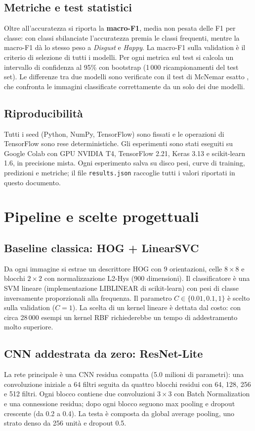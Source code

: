 \documentclass[11pt,a4paper]{article}
\begin{document}
\subsection{Metriche e test statistici}
Oltre all'accuratezza si riporta la \textbf{macro-F1}, media non pesata delle F1 per classe: con classi sbilanciate l'accuratezza premia le classi frequenti, mentre la macro-F1 dà lo stesso peso a \textit{Disgust} e \textit{Happy}. La macro-F1 sulla validation è il criterio di selezione di tutti i modelli. Per ogni metrica sul test si calcola un intervallo di confidenza al 95\% con bootstrap (1\,000 ricampionamenti del test set). Le differenze tra due modelli sono verificate con il test di McNemar esatto \cite{dietterich1998tests}, che confronta le immagini classificate correttamente da un solo dei due modelli.

\subsection{Riproducibilità}
Tutti i seed (Python, NumPy, TensorFlow) sono fissati e le operazioni di TensorFlow sono rese deterministiche. Gli esperimenti sono stati eseguiti su Google Colab con GPU NVIDIA T4, TensorFlow 2.21, Keras 3.13 e scikit-learn 1.6, in precisione mista. Ogni esperimento salva su disco pesi, curve di training, predizioni e metriche; il file \texttt{results.json} raccoglie tutti i valori riportati in questo documento.

\section{Pipeline e scelte progettuali}
\subsection{Baseline classica: HOG + LinearSVC}
Da ogni immagine si estrae un descrittore HOG \cite{dalal2005hog} con 9 orientazioni, celle $8\times8$ e blocchi $2\times2$ con normalizzazione L2-Hys (900 dimensioni). Il classificatore è una SVM lineare (implementazione LIBLINEAR di scikit-learn) con pesi di classe inversamente proporzionali alla frequenza. Il parametro $C\in\{0.01, 0.1, 1\}$ è scelto sulla validation ($C=1$). La scelta di un kernel lineare è dettata dal costo: con circa 28\,000 esempi un kernel RBF richiederebbe un tempo di addestramento molto superiore.

\subsection{CNN addestrata da zero: ResNet-Lite}
La rete principale è una CNN residua compatta (5.0 milioni di parametri): una convoluzione iniziale a 64 filtri seguita da quattro blocchi residui \cite{he2016resnet} con 64, 128, 256 e 512 filtri. Ogni blocco contiene due convoluzioni $3\times3$ con Batch Normalization e una connessione residua; dopo ogni blocco seguono max pooling e dropout crescente (da 0.2 a 0.4). La testa è composta da global average pooling, uno strato denso da 256 unità e dropout 0.5.
\end{document}
